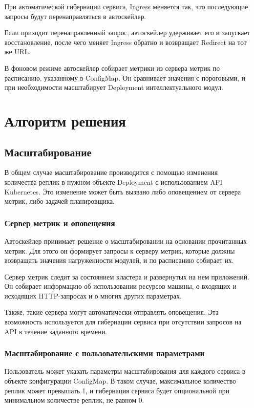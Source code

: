 \documentclass[a4paper]{article}
\begin{document}
При автоматической гибернации сервиса, Ingress меняется так, что
последующие запросы будут перенаправляться в автоскейлер.

Если приходит перенаправленный запрос, автоскейлер удерживает его и
запускает восстановление, после чего меняет Ingress обратно и возвращает
Redirect на тот же URL.

В фоновом режиме автоскейлер собирает метрики из сервера метрик по расписанию,
указанному в ConfigMap. Он сравнивает значения с пороговыми, и при необходимости
масштабирует Deployment интеллектуального модул.

\section{Алгоритм решения}

\subsection{Масштабирование}

В общем случае масштабирование производится с помощью изменения количества
реплик в нужном объекте Deployment с использованием API Kubernetes.
Это изменение может быть вызвано либо оповещением от сервера метрик,
либо задачей планировщика.

\subsubsection{Сервер метрик и оповещения}

Автоскейлер принимает решение о масштабировании на основании прочитанных метрик.
Для этого он формирует запросы к серверу метрик, которые должны возвращать
значения нагруженности модулей, и по расписанию собирает их.

Сервер метрик следит за состоянием кластера и развернутых на нем приложений.
Он собирает информацию об использовании ресурсов машины, о входящих и
исходящих HTTP-запросах и о многих других параметрах.

Также, такие сервера могут автоматически отправлять оповещения. Эта возможность
используется для гибернации сервиса при отсутствии запросов на API в течение
заданного времени.

\subsubsection{Масштабирование с пользовательскими параметрами}

Пользователь может указать параметры масштабирования для каждого
сервиса в объекте конфигурации ConfigMap. В таком случае,
максимальное количество реплик может превышать 1, и гибернация
сервиса будет опциональной при минимальном количестве реплик, не равном 0.
\end{document}
